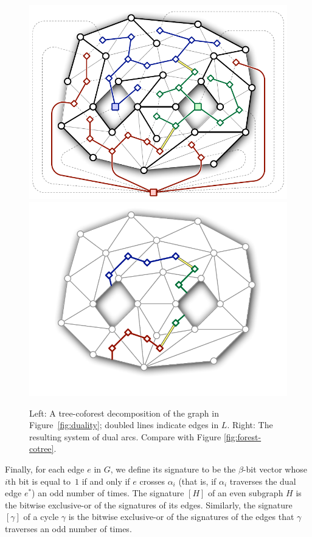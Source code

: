 \documentclass[letterpaper,review]{siamart190516}
\def\cycle{\gamma}
\def\dualarc{\alpha}
\begin{document}
\begin{figure}[htb]
\centering\footnotesize\sf
\includegraphics[scale=0.45]{Fig/tree-coforest2} \qquad
\includegraphics[scale=0.45]{Fig/tree-coforest-arcs2}
\caption{Left: A tree-coforest decomposition of the graph in Figure~\ref{fig:duality}; doubled lines indicate edges in $L$.
Right: The resulting system of dual arcs.  Compare with Figure \ref{fig:forest-cotree}.}
\label{fig:tree-coforest}
\end{figure}

Finally, for each edge $e$ in $G$, we define its signature \EMPH{$[e]$} to be the $\beta$-bit vector whose $i$th bit is equal to~$1$ if and only if $e$ crosses $\dualarc_i$ (that is, if $\dualarc_i$ traverses the dual edge $e^*$) an odd number of times. The signature $[H]$ of an even subgraph $H$ is the bitwise exclusive-or of the signatures of its edges.  Similarly, the signature~$[\cycle]$ of a cycle $\cycle$ is the bitwise exclusive-or of the signatures of the edges that $\cycle$ traverses an odd number of times.
\end{document}
